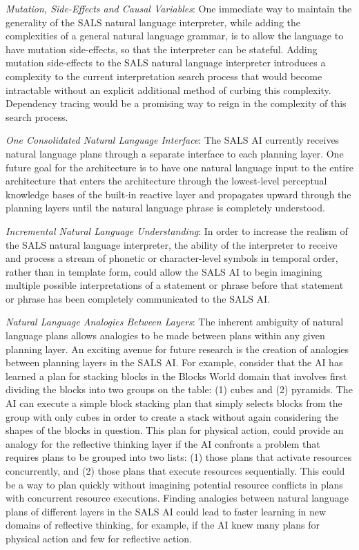 \begin{packed_enumerate}
\item{\emph{Mutation, Side-Effects and Causal Variables}: One
  immediate way to maintain the generality of the SALS natural
  language interpreter, while adding the complexities of a general
  natural language grammar, is to allow the language to have mutation
  side-effects, so that the interpreter can be stateful.  Adding
  mutation side-effects to the SALS natural language interpreter
  introduces a complexity to the current interpretation search process
  that would become intractable without an explicit additional method
  of curbing this complexity.  Dependency tracing would be a promising
  way to reign in the complexity of this search process.}
\item{\emph{One Consolidated Natural Language Interface}: The SALS AI
  currently receives natural language plans through a separate
  interface to each planning layer.  One future goal for the
  architecture is to have one natural language input to the entire
  architecture that enters the architecture through the lowest-level
  perceptual knowledge bases of the built-in reactive layer and
  propagates upward through the planning layers until the natural
  language phrase is completely understood.}
\item{\emph{Incremental Natural Language Understanding}: In order to
  increase the realism of the SALS natural language interpreter, the
  ability of the interpreter to receive and process a stream of
  phonetic or character-level symbols in temporal order, rather than
  in template form, could allow the SALS AI to begin imagining
  multiple possible interpretations of a statement or phrase before
  that statement or phrase has been completely communicated to the
  SALS AI.}
\item{\emph{Natural Language Analogies Between Layers}: The inherent
  ambiguity of natural language plans allows analogies to be made
  between plans within any given planning layer.  An exciting avenue
  for future research is the creation of analogies between planning
  layers in the SALS AI.  For example, consider that the AI has
  learned a plan for stacking blocks in the Blocks World domain that
  involves first dividing the blocks into two groups on the table: (1)
  cubes and (2) pyramids.  The AI can execute a simple block stacking
  plan that simply selects blocks from the group with only cubes in
  order to create a stack without again considering the shapes of the
  blocks in question.  This plan for physical action, could provide an
  analogy for the reflective thinking layer if the AI confronts a
  problem that requires plans to be grouped into two lists: (1) those
  plans that activate resources concurrently, and (2) those plans that
  execute resources sequentially.  This could be a way to plan quickly
  without imagining potential resource conflicts in plans with
  concurrent resource executions.  Finding analogies between natural
  language plans of different layers in the SALS AI could lead to
  faster learning in new domains of reflective thinking, for example,
  if the AI knew many plans for physical action and few for reflective
  action.}
\end{packed_enumerate}

